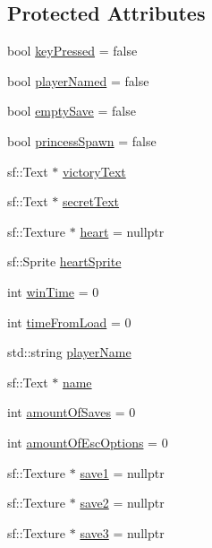 \subsection*{Protected Attributes}
\begin{DoxyCompactItemize}
\item 
bool \hyperlink{classTestApp_adbba8de35ec57db1dff011a828d82f10}{key\+Pressed} = false
\item 
bool \hyperlink{classTestApp_a99c2afa2a2f7e902d2f17d43658d16b3}{player\+Named} = false
\item 
bool \hyperlink{classTestApp_a45fe06d0a24cd73ea34617760a432985}{empty\+Save} = false
\item 
bool \hyperlink{classTestApp_a4ceef8b5824978f9be98ef51d58a6b8f}{princess\+Spawn} = false
\item 
sf\+::\+Text $\ast$ \hyperlink{classTestApp_a11b6f78ad8d0e5eaf77971cbf8cbe723}{victory\+Text}
\item 
sf\+::\+Text $\ast$ \hyperlink{classTestApp_a9ec0950ad6b860a2e88a9450811afcb1}{secret\+Text}
\item 
sf\+::\+Texture $\ast$ \hyperlink{classTestApp_a612d3439d9e00d32cceb928bddc07649}{heart} = nullptr
\item 
sf\+::\+Sprite \hyperlink{classTestApp_a9f761bf2b2ac16536a2459ae6730f0c0}{heart\+Sprite}
\item 
int \hyperlink{classTestApp_a87f8cb9a20615e4e0b08b583a7faaaf5}{win\+Time} = 0
\item 
int \hyperlink{classTestApp_a24a4c1488f91c8e7933b8f6cc4230d01}{time\+From\+Load} = 0
\item 
std\+::string \hyperlink{classTestApp_a0e02b27103439e2947632007ad9fe122}{player\+Name}
\item 
sf\+::\+Text $\ast$ \hyperlink{classTestApp_a2b66863e154bba70cd466f3a0ac757e2}{name}
\item 
int \hyperlink{classTestApp_aa71d097d6dc89a017be31826983e24d3}{amount\+Of\+Saves} = 0
\item 
int \hyperlink{classTestApp_a06f690797d69d08919e18257301b4e04}{amount\+Of\+Esc\+Options} = 0
\item 
sf\+::\+Texture $\ast$ \hyperlink{classTestApp_a417b00dc428dd1d901ceabeb754e3560}{save1} = nullptr
\item 
sf\+::\+Texture $\ast$ \hyperlink{classTestApp_a973c05176213696787de96f9e0a434f7}{save2} = nullptr
\item 
sf\+::\+Texture $\ast$ \hyperlink{classTestApp_aed20655a3a3ac65396bfb768f0f6eb52}{save3} = nullptr
\item 

\end{DoxyCompactItemize}
